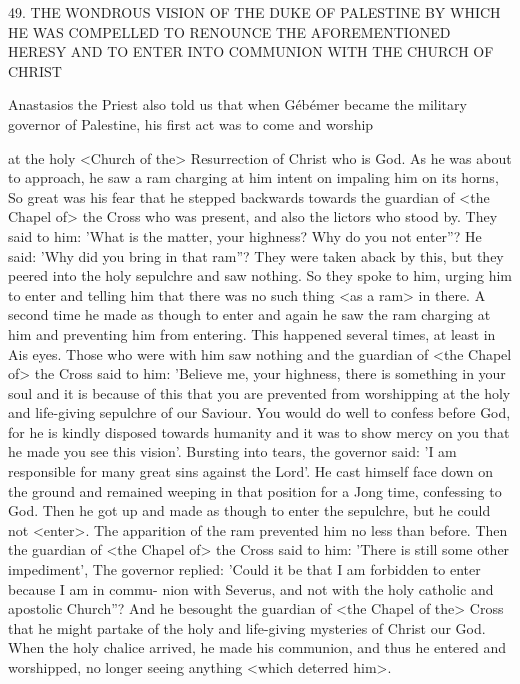 49. THE WONDROUS VISION OF THE DUKE OF
PALESTINE BY WHICH HE WAS COMPELLED
TO RENOUNCE THE AFOREMENTIONED HERESY
AND TO ENTER INTO COMMUNION
WITH THE CHURCH OF CHRIST

Anastasios the Priest also told us that when Gébémer became the
military governor of Palestine, his first act was to come and worship

at the holy <Church of the> Resurrection of Christ who is God. As
he was about to approach, he saw a ram charging at him intent on
impaling him on its horns, So great was his fear that he stepped
backwards towards the guardian of <the Chapel of> the Cross who
was present, and also the lictors who stood by. They said to him:
'What is the matter, your highness? Why do you not enter”? He
said: 'Why did you bring in that ram”? They were taken aback by
this, but they peered into the holy sepulchre and saw nothing. So
they spoke to him, urging him to enter and telling him that there
was no such thing <as a ram> in there. A second time he made as
though to enter and again he saw the ram charging at him and
preventing him from entering. This happened several times, at least
in Ais eyes. Those who were with him saw nothing and the guardian
of <the Chapel of> the Cross said to him: 'Believe me, your
highness, there is something in your soul and it is because of this
that you are prevented from worshipping at the holy and life-giving
sepulchre of our Saviour. You would do well to confess before God,
for he is kindly disposed towards humanity and it was to show
mercy on you that he made you see this vision'. Bursting into tears,
the governor said: 'I am responsible for many great sins against the
Lord'. He cast himself face down on the ground and remained
weeping in that position for a Jong time, confessing to God. Then
he got up and made as though to enter the sepulchre, but he could
not <enter>. The apparition of the ram prevented him no less than
before. Then the guardian of <the Chapel of> the Cross said to
him: 'There is still some other impediment', The governor replied:
'Could it be that I am forbidden to enter because I am in commu-
nion with Severus, and not with the holy catholic and apostolic
Church”? And he besought the guardian of <the Chapel of the>
Cross that he might partake of the holy and life-giving mysteries of
Christ our God. When the holy chalice arrived, he made his
communion, and thus he entered and worshipped, no longer seeing
anything <which deterred him>.

